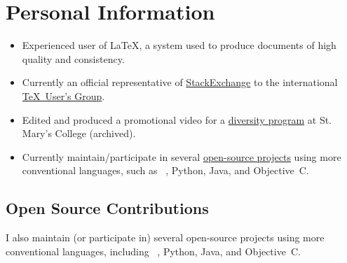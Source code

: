 \documentclass{simplecv}
\newif\ifgithub
\begin{document}
\section{Personal Information}
\begin{itemize}
\item Experienced user of \LaTeX, a system used to produce documents
  of high quality and consistency.
\item Currently an official representative of
  \href{http://meta.tex.stackexchange.com/a/4174/17423}{StackExchange}
  to the international \href{http://www.tug.org}{\TeX\ User's Group}.
\item Edited and produced a promotional video for a \href{http://www.smcm.edu/desousabrent}{diversity program} at St. Mary's College (archived).
\item Currently maintain\slash participate in several
  \href{http://www.github.com/vermiculus}{open-source projects}
  using more conventional languages, such as
  ~\Lisp, Python, Java, and Objective~C.
\end{itemize}
\vfill
\ifgithub
\subsection{Open Source Contributions \hfill {}}

I also maintain (or participate in) several open-source projects
  using more conventional languages,
  including ~\Lisp, Python, Java, and Objective~C.




\end{document}
